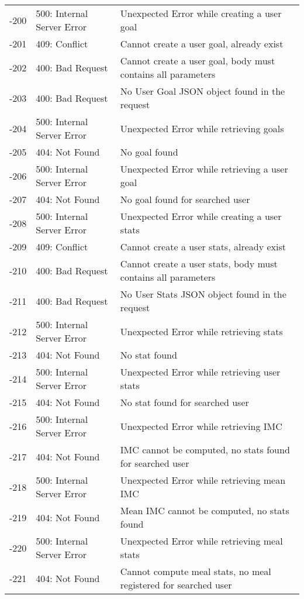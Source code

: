 \begin{longtable}{ | c | l | p{} | }
-200 & 500: Internal Server Error & Unexpected Error while creating a user goal \\
-201 & 409: Conflict & Cannot create a user goal, already exist \\
-202 & 400: Bad Request & Cannot create a user goal, body must contains all parameters \\
-203 & 400: Bad Request & No User Goal JSON object found in the request \\
-204 & 500: Internal Server Error & Unexpected Error while retrieving goals \\
-205 & 404: Not Found & No goal found \\
-206 & 500: Internal Server Error & Unexpected Error while retrieving a user goal \\
-207 & 404: Not Found & No goal found for searched user \\
-208 & 500: Internal Server Error & Unexpected Error while creating a user stats \\
-209 & 409: Conflict & Cannot create a user stats, already exist \\
-210 & 400: Bad Request & Cannot create a user stats, body must contains all parameters \\
-211 & 400: Bad Request & No User Stats JSON object found in the request \\
-212 & 500: Internal Server Error & Unexpected Error while retrieving stats \\
-213 & 404: Not Found & No stat found \\
-214 & 500: Internal Server Error & Unexpected Error while retrieving user stats \\
-215 & 404: Not Found & No stat found for searched user \\
-216 & 500: Internal Server Error & Unexpected Error while retrieving IMC \\
-217 & 404: Not Found & IMC cannot be computed, no stats found for searched user \\
-218 & 500: Internal Server Error & Unexpected Error while retrieving mean IMC \\
-219 & 404: Not Found & Mean IMC cannot be computed, no stats found \\
-220 & 500: Internal Server Error & Unexpected Error while retrieving meal stats \\
-221 & 404: Not Found & Cannot compute meal stats, no meal registered for searched user \\\hline


\end{longtable}
